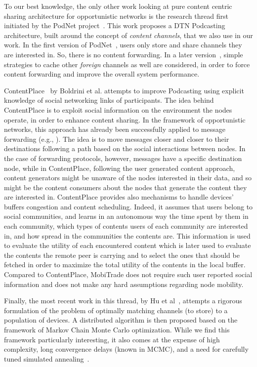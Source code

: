 To our best knowledge, the only other work looking at pure content centric sharing architecture for opportunistic networks is the research thread first initiated by the PodNet project~\cite{May07wirelessopportunistic, podnet07}. This work proposes a DTN Podcasting architecture, built around the concept of \emph{content channels}, that we also use in our work. In the first version of PodNet~\cite{May07wirelessopportunistic}, users only store and share channels they are interested in. So, there is no content forwarding. In a later version~\cite{podnet07}, simple strategies to cache other \emph{foreign} channels as well are considered, in order to force content forwarding and  improve the overall system performance. 
 
ContentPlace~\cite{ContentPlace} by Boldrini et al. attempts to improve Podcasting using explicit knowledge of social networking links of participants. The idea behind ContentPlace is to exploit social information on the environment the nodes operate, in order to enhance content sharing. In the framework of opportunistic networks, this approach has already been successfully applied to message forwarding (e.g., \cite{Boldrini:SocialForwarding}). The idea is to move messages closer and closer to their destinations following a path based on the social interactions between nodes. In the case of forwarding protocols, however, messages have a specific destination node, while in ContentPlace, following the user generated content 
approach, content generators might be unaware of the nodes interested in their data, and so might be the content consumers about the
nodes that generate the content they are interested in. ContentPlace provides also mechanisms to handle devices' buffers congestion and content scheduling. Indeed, it assumes that users belong to social communities, and learns in an autonomous way the time spent by them in each community, which types of contents users of each community are interested in, and how spread in the communities the contents are. This information is used to evaluate the utility of each encountered content which is later used to evaluate the contents the remote peer is carrying and to select the ones that should be fetched in order to maximize the total utility of the contents in the local buffer. Compared to ContentPlace, MobiTrade does not require such user reported social information and does not make any hard assumptions regarding node mobility. 
 
Finally, the most recent work in this thread, by Hu et al~\cite{OptimalChannelChoice}, attempts a rigorous formulation of the problem of optimally matching channels (to store) to a population of devices. A distributed algorithm is then proposed based on the framework of Markov Chain Monte Carlo optimization. While we find this framework particularly interesting, it also comes at the expense of high complexity, long convergence delays (known in MCMC), and a need for carefully tuned simulated annealing~\cite{mcmc-bremaud}.

